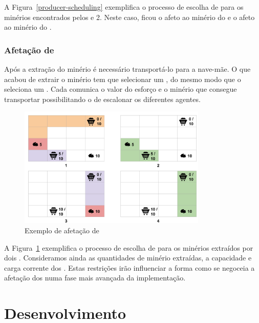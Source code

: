\documentclass[12pt]{report}
\begin{document}
A Figura~\ref{producer-scheduling} exemplifica o processo de escolha de \producers para os minérios encontrados pelos  e 2. 
Neste caso, ficou o  afeto ao minério do  e o  afeto ao minério do .

\FloatBarrier
\subsection{Afetação de \transporters}
Após a extração do minério é necessário transportá-lo para a nave-mãe. 
O \producer que acabou de extrair o minério tem que selecionar um \transporter, do mesmo modo que o \spotter seleciona um \producer. 
Cada \transporter comunica o valor do esforço e o minério que consegue transportar possibilitando o \producer de escalonar os diferentes agentes.

\begin{figure}[h]
	\centering
    \includegraphics[width=0.8\textwidth]{transporter-scheduling}
	\caption{Exemplo de afetação de \transporters}
	\label{transporter-scheduling}
\end{figure}

A Figura~\ref{transporter-scheduling} exemplifica o processo de escolha de \transporters para os minérios extraídos por dois \producers. Consideramos ainda as quantidades de minério extraídas, a capacidade e carga corrente dos \transporters. Estas restrições irão influenciar a forma como se negoceia a afetação dos \transporters numa fase mais avançada da implementação.


\chapter{Desenvolvimento}

\end{document}
